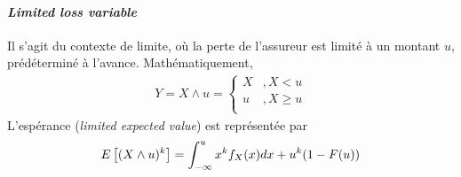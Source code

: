 \documentclass[12pt, french]{report}
\begin{document}
\paragraph{\textit{Limited loss variable}}
Il s'agit du contexte de limite, où la perte de l'assureur est limité à un montant $u$, prédéterminé à l'avance. Mathématiquement,
\begin{align*}
Y = X \wedge u = \begin{cases}
X & ,X < u \\
u & ,X \geq u \\
\end{cases}
\end{align*}
L'espérance (\textit{limited expected value}) est représentée par
\begin{equation}
E \left[ (X \wedge u)^k \right] = \int_{-\infty}^{u} x^k f_X(x) dx + u^k (1- F(u)) 
\end{equation}
\end{document}

